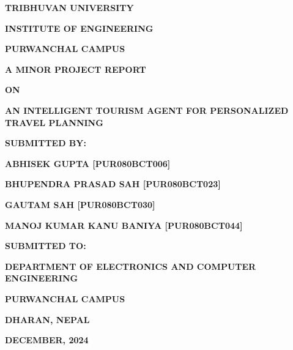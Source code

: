 \documentclass[12pt,a4paper]{report}
\begin{document}
\begin{titlepage}
    \centering
    \vspace*{0.5cm}
    
    {\bfseries\Large TRIBHUVAN UNIVERSITY \par}
    \vspace{0.2cm}
    {\bfseries\Large INSTITUTE OF ENGINEERING \par}
    \vspace{0.2cm}
    {\bfseries\Large PURWANCHAL CAMPUS \par}
    
    \vspace{1.2cm}
    
    \begin{center}
    \end{center}
    
    \vspace{1.2cm}
    
    {\bfseries\LARGE A MINOR PROJECT REPORT \par}
    \vspace{0.4cm}
    {\bfseries\Large ON \par}
    \vspace{0.4cm}
    {\bfseries\LARGE AN INTELLIGENT TOURISM AGENT FOR PERSONALIZED TRAVEL PLANNING \par}
    
    \vspace{1.6cm}
    
    {\bfseries\normalsize SUBMITTED BY: \par}
    \vspace{0.3cm}
    {\bfseries\normalsize ABHISEK GUPTA [PUR080BCT006] \par}
    {\bfseries\normalsize BHUPENDRA PRASAD SAH [PUR080BCT023] \par}
    {\bfseries\normalsize GAUTAM SAH [PUR080BCT030] \par}
    {\bfseries\normalsize MANOJ KUMAR KANU BANIYA [PUR080BCT044] \par}
    
    \vfill
    
    {\bfseries\normalsize SUBMITTED TO: \par}
    {\bfseries\normalsize DEPARTMENT OF ELECTRONICS AND COMPUTER ENGINEERING \par}
    {\bfseries\normalsize PURWANCHAL CAMPUS \par}
    {\bfseries\normalsize DHARAN, NEPAL \par}
    
    \vspace{0.8cm}
    {\bfseries\normalsize DECEMBER, 2024 \par}
\end{titlepage}
\end{document}
